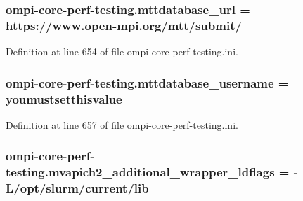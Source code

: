 \hypertarget{namespaceompi-core-perf-testing_a8c35ac7e49fb46fdb675243a9fb76845}{
\subsubsection[{mttdatabase\-\_\-url}]{\setlength{\rightskip}{0pt plus 5cm}ompi-\/core-\/perf-\/testing.\-mttdatabase\-\_\-url = https\-://www.\-open-\/mpi.\-org/mtt/submit/}}\label{namespaceompi-core-perf-testing_a8c35ac7e49fb46fdb675243a9fb76845}


Definition at line 654 of file ompi-\/core-\/perf-\/testing.\-ini.

\hypertarget{namespaceompi-core-perf-testing_ace7c5bc373c63b61305e4b9464ea0eac}{
\subsubsection[{mttdatabase\-\_\-username}]{\setlength{\rightskip}{0pt plus 5cm}ompi-\/core-\/perf-\/testing.\-mttdatabase\-\_\-username = youmustsetthisvalue}}\label{namespaceompi-core-perf-testing_ace7c5bc373c63b61305e4b9464ea0eac}


Definition at line 657 of file ompi-\/core-\/perf-\/testing.\-ini.

\hypertarget{namespaceompi-core-perf-testing_a2fa43ea204acc1dcec3c162a8df26ddf}{
\subsubsection[{mvapich2\-\_\-additional\-\_\-wrapper\-\_\-ldflags}]{\setlength{\rightskip}{0pt plus 5cm}ompi-\/core-\/perf-\/testing.\-mvapich2\-\_\-additional\-\_\-wrapper\-\_\-ldflags = -\/L/opt/slurm/current/lib}}\label{namespaceompi-core-perf-testing_a2fa43ea204acc1dcec3c162a8df26ddf}


